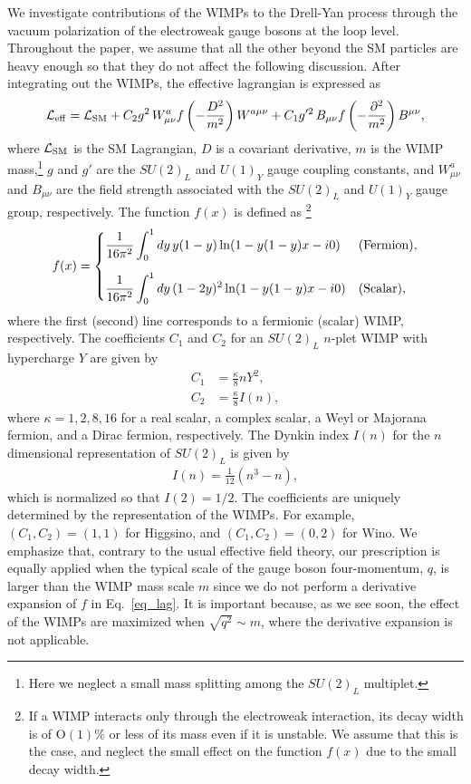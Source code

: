 \documentclass[12pt,twoside,book]{article}
\begin{document}
We investigate contributions of the WIMPs to the Drell-Yan process through the vacuum polarization of the electroweak gauge bosons at the loop level.
Throughout the paper, we assume that all the other beyond the SM particles are heavy enough so that they do not affect the following discussion.
After integrating out the WIMPs, the effective lagrangian is expressed as
\begin{align}
 \mathcal{L}_{\rm eff} = \mathcal{L}_{\rm SM} + C_2 g^2\, W_{\mu \nu}^a
 f\left(-\frac{D^2}{m^2}\right) W^{a\mu\nu} + C_1 g'^2\, B_{\mu\nu}
 f\left(-\frac{\partial^2}{m^2}\right) B^{\mu\nu},\label{eq_lag}
\end{align}
where $\mathcal{L}_{\rm SM}$ is the SM Lagrangian, $D$ is a covariant derivative, $m$ is the WIMP mass,\footnote{
  Here we neglect a small mass splitting among the $SU(2)_L$ multiplet.
}
$g$ and $g'$ are the $SU(2)_L$ and $U(1)_Y$ gauge coupling constants, and $W_{\mu\nu}^a$ and $B_{\mu\nu}$ are the field strength associated with the $SU(2)_L$ and $U(1)_Y$ gauge group, respectively.
The function $f(x)$ is defined as
\footnote{
  If a WIMP interacts only through the electroweak interaction, its decay width is of $\mathrm{O}(1)\%$ or less of its mass even if it is unstable.
  We assume that this is the case, and neglect the small effect on the function $f(x)$ due to the small decay width.
}
\begin{align}
 f(x) = \begin{cases}
	 \displaystyle{\frac{1}{16\pi^2} \int_0^1 dy\, y(1-y) \ln (1 -
	 y(1-y)x - i0)} & {\rm (Fermion)},\\[5mm]
	 \displaystyle{\frac{1}{16\pi^2} \int_0^1 dy\, (1-2y)^2 \ln (1-
	 y(1-y)x - i0)} & {\rm (Scalar)},
	\end{cases}\label{eq_f}
\end{align}
where the first (second) line corresponds to a fermionic (scalar) WIMP, respectively.
The coefficients $C_1$ and $C_2$ for an $SU(2)_L$ $n$-plet WIMP with hypercharge $Y$ are given by
\begin{align}
 C_1 &= \frac{\kappa}{8} n Y^2,\label{eq_C1}\\
 C_2 &= \frac{\kappa}{8} I(n),\label{eq_C2}
\end{align}
where $\kappa = 1, 2, 8, 16$ for a real scalar, a complex scalar, a Weyl or Majorana fermion, and a Dirac fermion, respectively.
The Dynkin index $I(n)$ for the $n$ dimensional representation of $SU(2)_L$ is given by
\begin{align}
  I(n) = \frac{1}{12} (n^3 - n),\label{eq_dynkin}
\end{align}
which is normalized so that $I(2) = 1/2$.
The coefficients are uniquely determined by the representation of the WIMPs.
For example, $(C_1, C_2) = (1, 1)$ for Higgsino, and $(C_1, C_2) = (0, 2)$ for Wino.
We emphasize that, contrary to the usual effective field theory, our prescription is equally applied when the typical scale of the gauge boson four-momentum, $q$, is larger than the WIMP mass scale $m$ since we do not perform a derivative expansion of $f$ in
Eq.~\eqref{eq_lag}.
It is important because, as we see soon, the effect of the WIMPs are maximized when $\sqrt{q^2}\sim m$, where the derivative expansion is not applicable.
\end{document}
